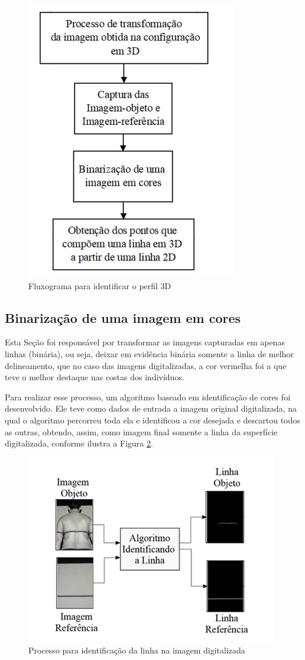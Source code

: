 \documentclass[a4paper, 12pt]{article}
\begin{document}
\begin{figure}[h!]
	\centering
		\includegraphics[width=.55\linewidth]{fluxograma_identificar_3D.png}
	\caption{Fluxograma para identificar o perfil 3D}
	\label{fluxograma_identificar_3D}
\end{figure}

\subsection{Binarização de uma imagem em cores}

Esta Seção foi responsável por transformar as imagens capturadas em apenas linhas (binária), ou seja, deixar em evidência binária somente a linha de melhor delineamento, que no caso das imagens digitalizadas, a cor vermelha foi a que teve o melhor destaque nas costas dos indivíduos.

Para realizar esse processo, um algoritmo baseado em identificação de cores foi desenvolvido. Ele teve como dados de entrada a imagem original digitalizada, na qual o algoritmo percorreu toda ela e identificou a cor desejada e descartou todos as outras, obtendo, assim, como imagem final somente a linha da superfície digitalizada, conforme ilustra a Figura \ref{identificar linha na imagem}.

\begin{figure}[h!]
	\centering
		\includegraphics[width=.75\linewidth]{identificar_linha_imagem.png}
	\caption{Processo para identificação da linha na imagem digitalizada}
	\label{identificar linha na imagem}
\end{figure}
\end{document}
